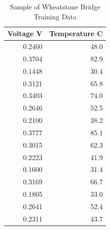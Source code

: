 \begin{table}[H]
\centering
\caption{Sample of Wheatstone Bridge Training Data}
\label{table:wheatstone_training_table}
\begin{tabular}{rr}
\toprule
 Voltage V & Temperature C \\
\midrule
 0.2460 & 48.0 \\
 0.3704 & 82.9 \\
 0.1448 & 30.4 \\
 0.3121 & 65.8 \\
 0.3403 & 74.0 \\
 0.2646 & 52.5 \\
 0.2100 & 38.2 \\
 0.3777 & 85.1 \\
 0.3015 & 62.3 \\
 0.2223 & 41.9 \\
 0.1600 & 31.4 \\
 0.3169 & 66.7 \\
 0.1805 & 33.0 \\
 0.2641 & 52.4 \\
 0.2311 & 43.7 \\
\bottomrule
\end{tabular}
\end{table}
